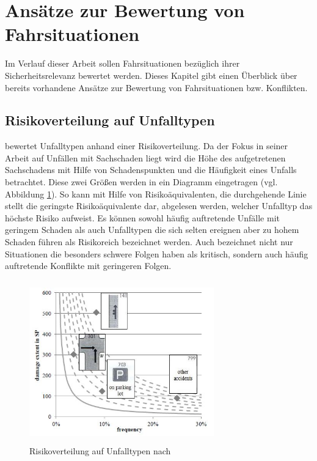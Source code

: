 \section{Ansätze zur Bewertung von Fahrsituationen}\label{section:Ansätze zur Bewertung von Fahrsituationen}
Im Verlauf dieser Arbeit sollen Fahrsituationen bezüglich ihrer Sicherheitsrelevanz bewertet werden. Dieses Kapitel gibt einen Überblick über bereits vorhandene Ansätze zur Bewertung von Fahrsituationen bzw. Konflikten. %

\subsection{Risikoverteilung auf Unfalltypen}\label{subsection:Risikoverteilung auf Unfalltypen}
\Textcite[S. 60]{Gschwendtner.2015} bewertet Unfalltypen anhand einer Risikoverteilung. Da der Fokus in seiner Arbeit auf Unfällen mit Sachschaden liegt wird die Höhe des aufgetretenen Sachschadens mit Hilfe von Schadenspunkten und die Häufigkeit eines Unfalls betrachtet. Diese zwei Größen werden in ein Diagramm eingetragen (vgl. Abbildung \ref{fig:Risikoverteilung}). So kann mit Hilfe von Risikoäquivalenten, die durchgehende Linie stellt die geringste Risikoäquivalente dar, abgelesen werden, welcher Unfalltyp das höchste Risiko aufweist. Es können sowohl häufig auftretende Unfälle mit geringem Schaden als auch Unfalltypen die sich selten ereignen aber zu hohem Schaden führen als Risikoreich bezeichnet werden. Auch \Textcite[S. 14]{Mages.2008} bezeichnet nicht nur Situationen die besonders schwere Folgen haben als kritisch, sondern auch häufig auftretende Konflikte mit geringeren Folgen.

\begin{savenotes}
	\begin{figure}[H]
		\centering
		\includegraphics[width=8cm,height=7cm]{figures/Risikoverteilung}
		\caption[Risikoverteilung auf Unfalltypen.]{Risikoverteilung auf Unfalltypen nach \parencite[S. 376]{Gschwendtner.2014}}\label{fig:Risikoverteilung}
	\end{figure}
\end{savenotes}

